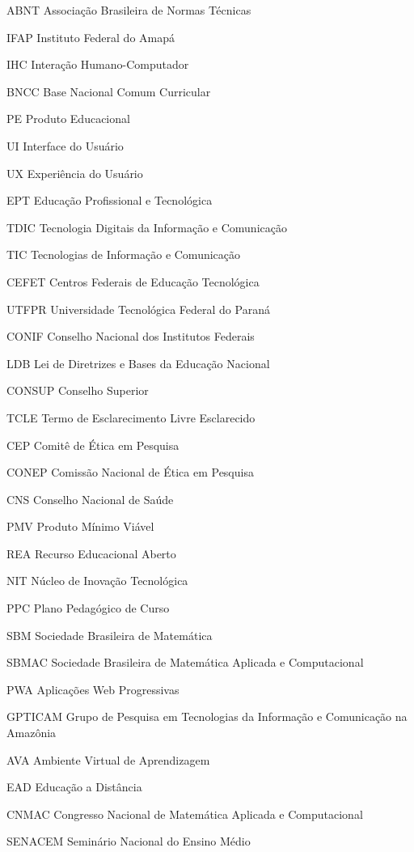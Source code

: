 \begin{siglas}
\item[ABNT] Associação Brasileira de Normas Técnicas
\item[IFAP] Instituto Federal do Amapá
\item[IHC] Interação Humano-Computador
\item[BNCC] Base Nacional Comum Curricular
\item[PE] Produto Educacional
\item[UI] Interface do Usuário
\item[UX] Experiência do Usuário
\item[EPT] Educação Profissional e Tecnológica
\item[TDIC] Tecnologia Digitais da Informação e Comunicação 
\item[TIC] Tecnologias de Informação e Comunicação
\item[CEFET] Centros Federais de Educação Tecnológica
\item[UTFPR] Universidade Tecnológica Federal do Paraná
\item[CONIF] Conselho Nacional dos Institutos Federais
\item[LDB]  Lei de Diretrizes e Bases da Educação Nacional
\item[CONSUP] Conselho Superior 
\item[TCLE] Termo de Esclarecimento Livre Esclarecido 
\item[CEP] Comitê de Ética em Pesquisa 
\item[CONEP] Comissão Nacional de Ética em Pesquisa 
\item[CNS] Conselho Nacional de Saúde 
\item[PMV] Produto Mínimo Viável 
\item[REA] Recurso Educacional Aberto 
\item[NIT] Núcleo de Inovação Tecnológica 
\item[PPC] Plano Pedagógico de Curso
\item[SBM] Sociedade Brasileira de Matemática
\item[SBMAC] Sociedade Brasileira de Matemática Aplicada e Computacional 
\item[PWA] Aplicações Web Progressivas
\item[GPTICAM] Grupo de Pesquisa em Tecnologias da Informação e Comunicação na Amazônia 
\item[AVA] Ambiente Virtual de Aprendizagem 
\item[EAD] Educação a Distância 
\item[CNMAC] Congresso Nacional de Matemática Aplicada e Computacional 
\item[SENACEM] Seminário Nacional do Ensino Médio 
\end{siglas}